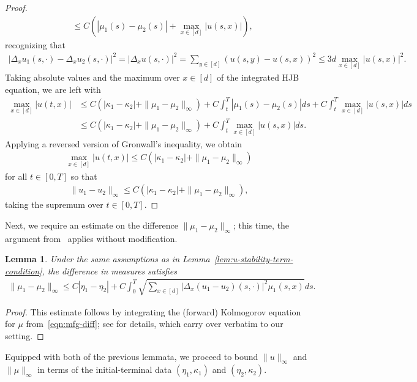 \documentclass[11pt,reqno]{amsart}
\numberwithin{equation}{section}
\theoremstyle{plain}
\newtheorem{lemma}{Lemma}[section]
\newcommand{\1}{\boldsymbol{\mathbbm{1}}}
\begin{document}
\begin{proof}
\begin{align*}
    &\leq C(|\mu_1(s) - \mu_2(s)| + \max_{x \in [d]}|u(s, x)|),
\end{align*}
recognizing that
\begin{align*}
    |\Delta_x u_1 (s,\cdot) -  \Delta_x u_2 (s,\cdot)|^2 = |\Delta_x u(s, \cdot)|^2 = \sum_{y \in [d]} (u(s, y) - u(s, x))^2 \leq 3d \max_{x \in [d]} |u(s, x)|^2.
\end{align*}
Taking absolute values and the maximum over $x \in [d]$ of the integrated HJB equation, we are left with
\begin{align*}
    \max_{x \in [d]} |u(t, x)| &\leq C(|\kappa_1 - \kappa_2| + \|\mu_1 - \mu_2\|_\infty) + C \int_t^T |\mu_1(s) - \mu_2(s)| ds + C \int_t^T \max_{x \in [d]} |u(s, x)| ds \\
    &\leq C(|\kappa_1 - \kappa_2| + \|\mu_1 - \mu_2\|_\infty) + C \int_t^T \max_{x \in [d]} |u(s, x)| ds.
\end{align*}
Applying a reversed version of Gronwall's inequality, we obtain
\begin{align*}
    \max_{x \in [d]} |u(t, x)| \leq C(|\kappa_1 - \kappa_2| + \|\mu_1 - \mu_2\|_\infty)
\end{align*}
for all $t \in [0, T]$ so that
\begin{align*}
    \|u_1 - u_2\|_\infty \leq C(|\kappa_1 - \kappa_2| + \|\mu_1 - \mu_2\|_\infty),
\end{align*}
taking the supremum over $t \in [0, T]$.
\end{proof}
Next, we require an estimate on  the difference $\|\mu_1 - \mu_2\|_\infty$; this time, the argument from~\cite{cec-pel2019} applies without modification.
\begin{lemma}
\label{lem:mu-intermediate-bound}
Under the same assumptions as in Lemma~\ref{lem:u-stability-term-condition}, the difference in measures satisfies
\begin{align*}
    \|\mu_1 - \mu_2\|_\infty \leq C|\eta_1 - \eta_2| + C \int_0^T \sqrt{\sum_{x \in [d]} |\Delta_x (u_1 - u_2)(s, \cdot)|^2 \mu_1(s, x)} ds.
\end{align*}
\end{lemma}
\begin{proof}
This estimate follows by integrating the (forward) Kolmogorov equation for $\mu$ from~\eqref{eqn:mfg-diff}; see \cite[Proposition 5]{cec-pel2019} for details, which carry over verbatim to our setting.
\end{proof}
Equipped with both of the previous lemmata, we proceed to bound $\|u\|_\infty$ and $\|\mu\|_\infty$ in terms of the initial-terminal data $(\eta_1, \kappa_1)$ and $(\eta_2, \kappa_2)$.
\end{document}

